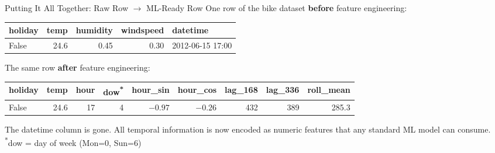 \documentclass[11pt,compress,t,notes=noshow, xcolor=table]{beamer}
\begin{document}
\begin{vbframe}{Putting It All Together: Raw Row $\rightarrow$ ML-Ready Row}
\vfill
\footnotesize
One row of the bike dataset \textbf{before} feature engineering:
\vspace{0.3em}

\begin{tabular}{lrrrl}
\toprule
holiday & temp & humidity & windspeed & datetime \\
\midrule
False & 24.6 & 0.45 & 0.30 & 2012-06-15 17:00 \\
\bottomrule
\end{tabular}

\vspace{0.8em}
The same row \textbf{after} feature engineering:
\vspace{0.3em}

\scriptsize
\begin{tabular}{lr|rr|rr|rr|r}
\toprule
holiday & temp & hour & dow\textsuperscript{*} & hour\_sin & hour\_cos & lag\_168 & lag\_336 & roll\_mean \\
\midrule
False & 24.6 & 17 & 4 & $-0.97$ & $-0.26$ & 432 & 389 & 285.3 \\
\bottomrule
\end{tabular}

\vspace{0.5em}
\normalsize
The datetime column is gone. All temporal information is now encoded as numeric features that any standard ML model can consume.\\
\textsuperscript{*}dow = day of week (Mon=0, Sun=6)
\vfill
\end{vbframe}


\end{document}
